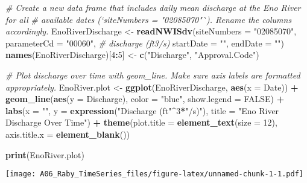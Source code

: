 \documentclass[]{article}
\newenvironment{Shaded}{\begin{snugshade}}{\end{snugshade}}
\newcommand{\CommentTok}[1]{\textcolor[rgb]{0.56,0.35,0.01}{\textit{#1}}}
\newcommand{\DataTypeTok}[1]{\textcolor[rgb]{0.13,0.29,0.53}{#1}}
\newcommand{\DecValTok}[1]{\textcolor[rgb]{0.00,0.00,0.81}{#1}}
\newcommand{\KeywordTok}[1]{\textcolor[rgb]{0.13,0.29,0.53}{\textbf{#1}}}
\newcommand{\NormalTok}[1]{#1}
\newcommand{\OperatorTok}[1]{\textcolor[rgb]{0.81,0.36,0.00}{\textbf{#1}}}
\newcommand{\OtherTok}[1]{\textcolor[rgb]{0.56,0.35,0.01}{#1}}
\newcommand{\StringTok}[1]{\textcolor[rgb]{0.31,0.60,0.02}{#1}}
\begin{document}
\begin{Shaded}
\begin{Highlighting}[]
\CommentTok{# Create a new data frame that includes daily mean discharge at the Eno River for all}
\CommentTok{# available dates (`siteNumbers = "02085070"`). Rename the columns accordingly.}
\NormalTok{EnoRiverDischarge <-}\StringTok{ }\KeywordTok{readNWISdv}\NormalTok{(}\DataTypeTok{siteNumbers =} \StringTok{"02085070"}\NormalTok{,}
                     \DataTypeTok{parameterCd =} \StringTok{"00060"}\NormalTok{, }\CommentTok{# discharge (ft3/s)}
                     \DataTypeTok{startDate =} \StringTok{""}\NormalTok{,}
                     \DataTypeTok{endDate =} \StringTok{""}\NormalTok{)}
\KeywordTok{names}\NormalTok{(EnoRiverDischarge)[}\DecValTok{4}\OperatorTok{:}\DecValTok{5}\NormalTok{] <-}\StringTok{ }\KeywordTok{c}\NormalTok{(}\StringTok{"Discharge"}\NormalTok{, }\StringTok{"Approval.Code"}\NormalTok{)}

\CommentTok{# Plot discharge over time with geom_line. Make sure axis labels are formatted appropriately.}
\NormalTok{EnoRiver.plot <-}\StringTok{ }\KeywordTok{ggplot}\NormalTok{(EnoRiverDischarge, }\KeywordTok{aes}\NormalTok{(}\DataTypeTok{x =}\NormalTok{ Date)) }\OperatorTok{+}
\StringTok{  }\KeywordTok{geom_line}\NormalTok{(}\KeywordTok{aes}\NormalTok{(}\DataTypeTok{y =}\NormalTok{ Discharge), }\DataTypeTok{color =} \StringTok{"blue"}\NormalTok{, }\DataTypeTok{show.legend =} \OtherTok{FALSE}\NormalTok{) }\OperatorTok{+}
\StringTok{  }\KeywordTok{labs}\NormalTok{(}\DataTypeTok{x =} \StringTok{""}\NormalTok{, }\DataTypeTok{y =} \KeywordTok{expression}\NormalTok{(}\StringTok{"Discharge (ft"}\OperatorTok{^}\DecValTok{3}\OperatorTok{*}\StringTok{"/s)"}\NormalTok{), }
       \DataTypeTok{title =} \StringTok{"Eno River Discharge Over Time"}\NormalTok{) }\OperatorTok{+}
\StringTok{  }\KeywordTok{theme}\NormalTok{(}\DataTypeTok{plot.title =} \KeywordTok{element_text}\NormalTok{(}\DataTypeTok{size =} \DecValTok{12}\NormalTok{),}
        \DataTypeTok{axis.title.x =} \KeywordTok{element_blank}\NormalTok{())}

\KeywordTok{print}\NormalTok{(EnoRiver.plot)}
\end{Highlighting}
\end{Shaded}

\texttt{[image: A06\_Raby\_TimeSeries\_files/figure-latex/unnamed-chunk-1-1.pdf]}

\begin{Shaded}
\end{Shaded}
\end{document}
